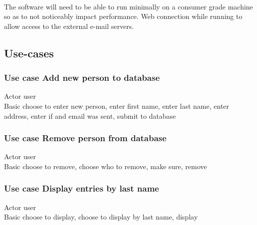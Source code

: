 \documentclass{article}
\begin{document}
\paragraph{}
The software will need to be able to run minimally on a consumer grade machine so as to not noticeably impact performance.
Web connection while running to allow access to the external e-mail servers.




\subsection{Use-cases}
\subsubsection*{Use case Add new person to database}
Actor user \\
Basic choose to enter new person, enter first name, enter last name, enter address, enter if and email was sent, submit to database \\

\subsubsection*{Use case Remove person from database}
Actor user \\
Basic choose to remove, choose who to remove, make sure, remove \\
 
\subsubsection*{Use case Display entries by last name}
Actor user \\
Basic choose to display, choose to display by last name, display \\
 
\end{document}
